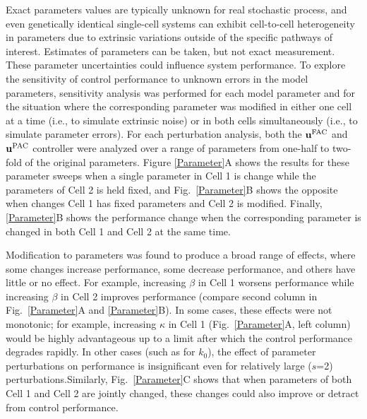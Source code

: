 \documentclass[12pt]{article}
\begin{document}
Exact parameters values are typically unknown for real stochastic process, and even genetically identical single-cell systems can exhibit cell-to-cell heterogeneity in parameters due to extrinsic variations outside of the specific pathways of interest. Estimates of parameters can be taken, but not exact measurement. These parameter uncertainties could influence system performance. To explore the sensitivity of control performance to unknown errors in the model parameters, sensitivity analysis was performed for each model parameter and for the situation where the corresponding parameter was modified in either one cell at a time (i.e., to simulate extrinsic noise) or in both cells simultaneously (i.e., to simulate parameter errors).  For each perturbation analysis, both the $\mathbf{u}^{\rm FAC}$ and $\mathbf{u}^{\rm PAC}$ controller were analyzed over a range of parameters from one-half to two-fold of the original parameters.
 Figure \ref{Parameter}A shows the results for these parameter sweeps when a single parameter in Cell 1 is change while the parameters of Cell 2 is held fixed, and Fig.\ \ref{Parameter}B shows the opposite when changes Cell 1 has fixed parameters and Cell 2 is modified.  Finally, \ref{Parameter}B  shows the performance change when the corresponding parameter is changed in both Cell 1 and Cell 2 at the same time.
 
Modification to parameters was found to produce a broad range of effects, where some changes increase performance, some decrease performance, and others have little or no effect. For example, increasing $\beta$ in Cell 1 worsens performance while increasing $\beta$ in Cell 2 improves performance (compare second column in Fig.\ \ref{Parameter}A and \ref{Parameter}B). In some cases, these effects were not monotonic; for example, increasing $\kappa$ in Cell 1 (Fig.\ \ref{Parameter}A, left column) would be highly advantageous up to a limit after which the control performance degrades rapidly. In other cases (such as for $k_0$), the effect of parameter perturbations on performance is insignificant even for relatively large ($s$=2) perturbations.Similarly, Fig.\ \ref{Parameter}C shows that when parameters of both Cell 1 and Cell 2 are jointly changed, these changes could also improve or detract from control performance.
\end{document}
